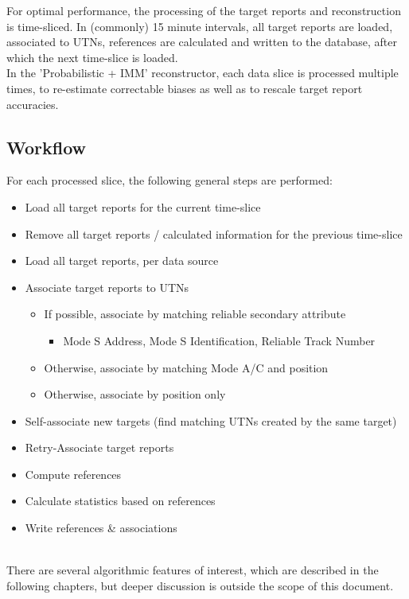 For optimal performance, the processing of the target reports and reconstruction is time-sliced. In (commonly) 15 minute intervals, all target reports are loaded, associated to UTNs, references are calculated and written to the database, after which the next time-slice is loaded. \\

In the 'Probabilistic + IMM' reconstructor, each data slice is processed multiple times, to re-estimate correctable biases as well as to rescale target report accuracies. \\

\subsection{Workflow}
For each processed slice, the following general steps are performed:

\begin{itemize}
\item Load all target reports for the current time-slice
\item Remove all target reports / calculated information for the previous time-slice
\item Load all target reports, per data source
\item Associate target reports to UTNs
   \begin{itemize}  
   \item If possible, associate by matching reliable secondary attribute
    \begin{itemize}  
    \item Mode S Address, Mode S Identification, Reliable Track Number
    \end{itemize}
   \item Otherwise, associate by matching Mode A/C and position
   \item Otherwise, associate by position only
   \end{itemize}
\item Self-associate new targets (find matching UTNs created by the same target)
\item Retry-Associate target reports
\item Compute references
\item Calculate statistics based on references
\item Write references \& associations
\end{itemize}
\ \\

There are several algorithmic features of interest, which are described in the following chapters, but deeper discussion is outside the scope of this document.

